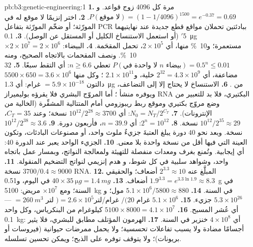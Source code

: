 \begin{solution}{pb:b3:genetic-engineering:1}
\textbf{1.} مرة كل $4096$ زوج قواعد. و$P(\text{لا موقع}) = (1 - 1/4096)^{1500}
= e^{-0.37} = 0.69$.
\textbf{2.} اختر إنزيمًا لا موقع له في المورّثة؛ أو ضخّم
المورّثة بتفاعل PCR ببادئتين تحملان مواقع قطع جديدة عند نهايتيهما 5$'$
(أو استعمل الاستنساخ الكليل أو المستقل عن الوصل).
\textbf{3.} \qty{0.1}{\micro g}\,$\times 2\times 10^{7} = 2\times
10^{6}$ مستعمرة؛ و\qty{10}{\%} منها، أي $2\times 10^{5}$، تحمل المقحَمة.
\textbf{4.} البيضاء: \qty{10}{\%}. ونصف المقحمات بالاتجاه
الصحيح، ومنه $P(\text{لا واحدة في } n \text{ بيضاء}) = 0.5^{n} \le 0.01$
تعطي $n \ge 6.6$: أي التقط سبعًا.
\textbf{5.} $32$ مضاعفة، أي $2^{32} = 4.3\times 10^{9}$ خلية، و$2.1\times
10^{11}$ ؛ وكل منها $5500\times 650 = 3.6\times 10^{6}$ دالتون $=
5.9\times 10^{-18}$ غرام: أي \qty{1.3}{\micro g} من .
\textbf{6.} الاستنساخ لا يحتاج إلا إلى التضاعف، ويوفره منشأ
؛ أما المروّج البشري فلا يقرؤه بوليميراز RNA البكتيري، فلا بد
للتعبير من وضع مروّج بكتيري وموقع ربط ريبوزومي
أمام المتتالية المشفِّرة (الخالية من الإنترونات).
\textbf{7.} $N_{0} = N_{T}/2^{C_{T}}$: أي $10^{12}/2^{28} \approx 3700$
نسخة؛ وعند $C_{T} = 35$، $10^{12}/2^{35} \approx 29$ نسخة.
\textbf{8.} $2^{n} = 10^{12}$: أي $n = 39.9$، فأربعون دورة.
\textbf{9.} $10^{12}/2^{38} \approx 3.6$ نسخة. وبعد نحو $40$
دورة يبلغ العتبةَ جزيءٌ ملوث واحد، أو مصنوعات البادئات،
وتكون العينة التي فيها أقل من نسخة واحدة بلا معنى.
\textbf{10.} الجزيء الواحد يعبر عند الدورة $40$: أي إيجابية. وتُمنع
بغرف ومعدات منفصلة للتهيئة ولمعالجة
النواتج، وبمسار عمل باتجاه واحد، وشواهد سلبية في كل شوط، و
هدم إنزيمي لنواتج التضخيم المنقولة.
\textbf{11.} $3700/0.4 \approx 9000$ نسخة RNA.
\textbf{12.} المبلَّغ عنه $2^{3.3} \approx 10$ أضعاف؛ والحقيقي $1.9^{3.3} =
e^{3.3\ln 1.9} \approx 8.3$ أضعاف.
\textbf{13.} $40\times \qty{35}{\micro g} = \qty{1.4}{mg}$ في اليوم،
و\qty{0.51}{g} في السنة؛ ومع $\times 10^{7}$ مريض: \qty{5100}{kg} في السنة.
\textbf{14.} $5.1\times 10^{6}/5800 \approx 880$ مول؛ و$5.3\times 10^{26}$
جزيء.
\textbf{15.} $5.1\times 10^{6}$ غرام $/ (20$ غرام/لتر$) = 2.6\times 10^{5}$ لتر
$= \qty{260}{m^3}$ --- أي عُشر المسبح.
\textbf{16.} $5100\times 8000 = 4.1\times 10^{7}$ كيلوغرام من البنكرياس، وكل واحد
\qty{0.1}{kg}: أي $4\times 10^{8}$ خنزير في السنة.
\textbf{17.} الهرمون المؤتلف مطابق للبشري، فلا
يثير أجسامًا مضادة ولا يسبب تفاعلات تحسسية؛ ولا يحمل
ممرضات حيوانية (فيروسات أو بريونات)؛ ولا يتوقف توفره على الذبح؛
ويمكن تحسين تسلسله.

\end{solution}
